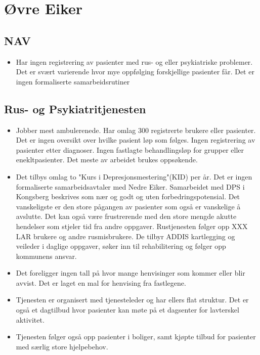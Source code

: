 \documentclass[11pt]{report} %
\begin{document}
                  \section{Øvre Eiker}\label{sec:org_oek}
                      
                      \subsection{NAV}
                        \begin{itemize} 
                          \item Har ingen registrering av pasienter med rus- og eller psykiatriske problemer. Det er svært varierende hvor mye oppfølging forskjellige pasienter får. Det er ingen formaliserte samarbeidsrutiner
                        \end{itemize}
                      
                      \subsection{Rus- og Psykiatritjenesten}
                      	
                        \begin{itemize}
                    	      \item Jobber mest ambulerenede. Har omlag 300 registrerte brukere eller pasienter. Det er ingen oversikt over hvilke pasient løp som følges. Ingen registrering av pasienter etter  diagnoser. Ingen fastlagte behandlingsløp for grupper eller enekltpasienter. Det meste av arbeidet brukes oppsøkende. 
                            \item Det tilbys omlag to "Kurs i Depresjonsmestering"(KID) per år. Det er ingen formaliserte samarbeidsavtaler med Nedre Eiker. Samarbeidet med DPS i Kongsberg beskrives som nær og godt og uten forbedringspotensial. Det vanskeligste er den store pågangen av pasienter som også er vanskelige å avslutte. Det kan også være frustrerende med den store mengde akutte hendelser som stjeler tid fra andre oppgaver. Rustjenesten følger opp XXX LAR brukere og andre rusmisbrukere. De tilbyr ADDIS kartlegging og veileder i daglige oppgaver, søker inn til rehabilitering og følger opp kommunens ansvar.
                            \item Det foreligger ingen tall på hvor mange henvisinger som kommer eller blir avvist. Det er laget en mal for henvising fra fastlegene. 
                            \item Tjenesten er organisert med tjenesteleder og har ellers flat struktur. Det er også et dagtilbud hvor pasienter kan møte på et dagsenter for lavterskel aktivitet. 
                            \item Tjenesten følger også opp pasienter i boliger, samt kjøpte tilbud for pasienter med særlig store hjelpebehov. 
                              \end{itemize}
                    
\end{document}
